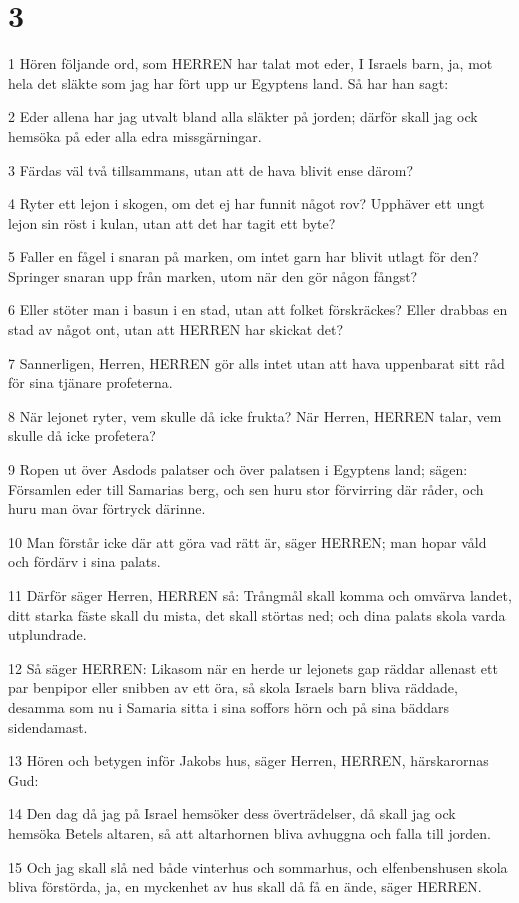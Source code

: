 \chapter{3}

\par 1 Hören följande ord, som HERREN har talat mot eder, I Israels barn, ja, mot hela det släkte som jag har fört upp ur Egyptens land. Så har han sagt:
\par 2 Eder allena har jag utvalt bland alla släkter på jorden; därför skall jag ock hemsöka på eder alla edra missgärningar.
\par 3 Färdas väl två tillsammans, utan att de hava blivit ense därom?
\par 4 Ryter ett lejon i skogen, om det ej har funnit något rov? Upphäver ett ungt lejon sin röst i kulan, utan att det har tagit ett byte?
\par 5 Faller en fågel i snaran på marken, om intet garn har blivit utlagt för den? Springer snaran upp från marken, utom när den gör någon fångst?
\par 6 Eller stöter man i basun i en stad, utan att folket förskräckes? Eller drabbas en stad av något ont, utan att HERREN har skickat det?
\par 7 Sannerligen, Herren, HERREN gör alls intet utan att hava uppenbarat sitt råd för sina tjänare profeterna.
\par 8 När lejonet ryter, vem skulle då icke frukta? När Herren, HERREN talar, vem skulle då icke profetera?
\par 9 Ropen ut över Asdods palatser och över palatsen i Egyptens land; sägen: Församlen eder till Samarias berg, och sen huru stor förvirring där råder, och huru man övar förtryck därinne.
\par 10 Man förstår icke där att göra vad rätt är, säger HERREN; man hopar våld och fördärv i sina palats.
\par 11 Därför säger Herren, HERREN så: Trångmål skall komma och omvärva landet, ditt starka fäste skall du mista, det skall störtas ned; och dina palats skola varda utplundrade.
\par 12 Så säger HERREN: Likasom när en herde ur lejonets gap räddar allenast ett par benpipor eller snibben av ett öra, så skola Israels barn bliva räddade, desamma som nu i Samaria sitta i sina soffors hörn och på sina bäddars sidendamast.
\par 13 Hören och betygen inför Jakobs hus, säger Herren, HERREN, härskarornas Gud:
\par 14 Den dag då jag på Israel hemsöker dess överträdelser, då skall jag ock hemsöka Betels altaren, så att altarhornen bliva avhuggna och falla till jorden.
\par 15 Och jag skall slå ned både vinterhus och sommarhus, och elfenbenshusen skola bliva förstörda, ja, en myckenhet av hus skall då få en ände, säger HERREN.

